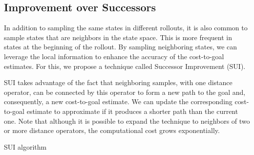 \subsection{Improvement over Successors}
\label{sec:hvfc}

In addition to sampling the same states in different rollouts, it is also common to sample states that are neighbors in the state space. This is more frequent in states at the beginning of the rollout. By sampling neighboring states, we can leverage the local information to enhance the accuracy of the cost-to-goal estimates. For this, we propose a technique called Successor Improvement (SUI).

SUI takes advantage of the fact that neighboring samples, with one distance operator, can be connected by this operator to form a new path to the goal and, consequently, a new cost-to-goal estimate. We can update the corresponding cost-to-goal estimate to approximate \hstar if it produces a shorter path than the current one. Note that although it is possible to expand the technique to neighbors of two or more distance operators, the computational cost grows exponentially.

\begin{algorithm}[ht]
    \SetAlgoLined




    \caption{SUI algorithm}
    \label{alg:sui}
\end{algorithm}

